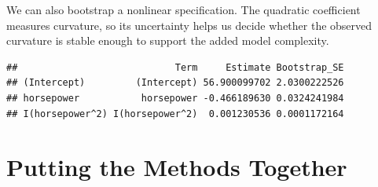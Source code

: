 \documentclass[
  11pt,
]{article}
\newenvironment{Shaded}{\begin{snugshade}}{\end{snugshade}}
\newcommand{\AttributeTok}[1]{\textcolor[rgb]{0.13,0.29,0.53}{#1}}
\newcommand{\ControlFlowTok}[1]{\textcolor[rgb]{0.13,0.29,0.53}{\textbf{#1}}}
\newcommand{\DecValTok}[1]{\textcolor[rgb]{0.00,0.00,0.81}{#1}}
\newcommand{\FunctionTok}[1]{\textcolor[rgb]{0.13,0.29,0.53}{\textbf{#1}}}
\newcommand{\NormalTok}[1]{#1}
\newcommand{\OtherTok}[1]{\textcolor[rgb]{0.56,0.35,0.01}{#1}}
\newcommand{\SpecialCharTok}[1]{\textcolor[rgb]{0.81,0.36,0.00}{\textbf{#1}}}
\begin{document}
We can also bootstrap a nonlinear specification. The quadratic
coefficient measures curvature, so its uncertainty helps us decide
whether the observed curvature is stable enough to support the added
model complexity.

\begin{Shaded}
\end{Shaded}

\begin{verbatim}
##                            Term     Estimate Bootstrap_SE
## (Intercept)         (Intercept) 56.900099702 2.0300222526
## horsepower           horsepower -0.466189630 0.0324241984
## I(horsepower^2) I(horsepower^2)  0.001230536 0.0001172164
\end{verbatim}

\section{Putting the Methods
Together}\label{putting-the-methods-together}
\end{document}
